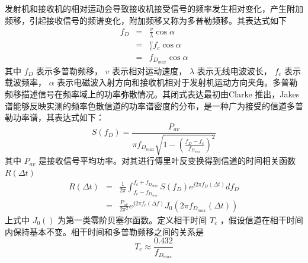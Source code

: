 \documentclass[10pt,a4paper,UTF8]{article}
\begin{document}
发射机和接收机的相对运动会导致接收机接受信号的频率发生相对变化，产生附加频移，引起接收信号的频谱变化，附加频移又称为多普勒频移。其表达式如下
\begin{eqnarray}
  \label{eq:doppler}
  f_D& =& \frac{v}{\lambda}\cos{\alpha} \nonumber \\
       &=& \frac{v}{c} f_c \cos{\alpha} \nonumber \\
        &=& f_{D_{max}} \cos{\alpha}
\end{eqnarray}
其中 \(f_D\) 表示多普勒频移， \(v\) 表示相对运动速度， \(\lambda\) 表示无线电波波长， \(f_c\) 表示载波频率， \(\alpha\) 表示电磁波入射方向和接收机相对于发射机运动方向夹角。多普勒频移描述信号在频率域上的功率弥散情况。其闭式表达最初由Clarke\cite{clarke1996} 推出，Jakes谱\cite{jakes1974}能够反映实测的频率色散信道的功率谱密度的分布，是一种广为接受的信道多普勒功率谱，其表达式如下：
\begin{equation}
  \label{eq:jakes}
  S(f_D) = \frac{P_{av}}{\pi f_{D_{max}} \sqrt{ 1- (\frac{f_D-f_c}{f_{D_{max}}})^2}}
\end{equation}
其中 \(P_{av}\) 是接收信号平均功率。对其进行傅里叶反变换得到信道的时间相关函数 \(R(\Delta t)\)
\begin{eqnarray}
  \label{eq:tcf}
  R(\Delta t)&=& \frac{1}{2\pi} \int_{f_c -f_{D_{max}}}^{{f_c +f_{D_{max}}}} S(f_D) e^{j2\pi f_D(\Delta t)}df_D \nonumber \\
                  &=& \frac{P_{av}}{2\pi^2}e^{j2\pi f_c(\Delta f)}J_0(2\pi f_{D_{max}}(\Delta t))
\end{eqnarray}
上式中 \(J_0()\) 为第一类零阶贝塞尔函数。定义相干时间 \(T_c\) ，假设信道在相干时间内保持基本不变。相干时间和多普勒频移之间的关系是 $$T_c \approx \frac{0.432}{f_{D_{max}}}$$
\end{document}
